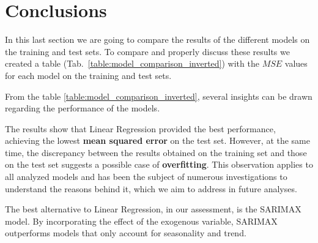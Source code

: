 \documentclass[10pt,twocolumn,letterpaper]{article}
\begin{document}
\section{Conclusions}

In this last section we are going to compare the results of the different models on the training and test sets. To compare and properly discuss these results we created a table (Tab.~\ref{table:model_comparison_inverted}) with the $MSE$ values for each model on the training and test sets.

\begin{table}[H]
\centering
{}
\caption{Performance metrics for different models (MSE)}
\label{table:model_comparison_inverted}
\end{table}

From the table \ref{table:model_comparison_inverted}, several insights can be drawn regarding the performance of the models.

The results show that Linear Regression provided the best performance, achieving the lowest \textbf{mean squared error} on the test set. However, at the same time, the discrepancy between the results obtained on the training set and those on the test set suggests a possible case of \textbf{overfitting}. This observation applies to all analyzed models and has been the subject of numerous investigations to understand the reasons behind it, which we aim to address in future analyses. %

The best alternative to Linear Regression, in our assessment, is the SARIMAX model. By incorporating the effect of the exogenous variable, SARIMAX outperforms models that only account for seasonality and trend.
\end{document}
